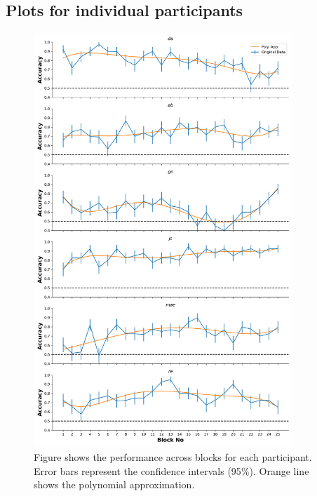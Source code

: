 \documentclass{article}
\begin{document}
\subsection{Plots for individual participants}
\label{learning}
\vspace{-0.7cm}
\begin{figure}[!hb]
    \centering
    \includegraphics[width = 0.87\textwidth]{plots/learning.png}
    \caption{Figure shows the performance across blocks for each participant. Error bars represent the confidence intervals (95$\%$). Orange line shows the polynomial approximation. }
    \label{fig:learning_curve}
\end{figure}
\clearpage
\end{document}
